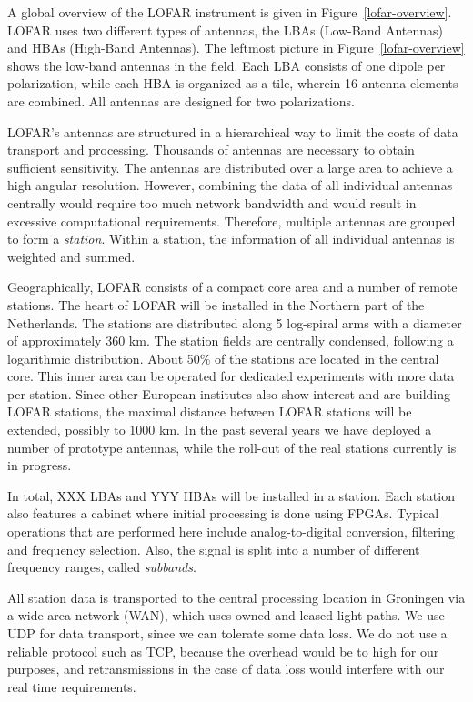 \documentclass[10pt]{article}
\begin{document}
A global overview of the LOFAR instrument is given in
Figure~\ref{lofar-overview}. LOFAR uses two different types of
antennas, the LBAs (Low-Band Antennas) and HBAs (High-Band Antennas).
The leftmost picture in Figure~\ref{lofar-overview} shows the low-band
antennas in the field.  Each LBA consists of one dipole per polarization,
while each HBA is organized as a tile, wherein 16 antenna elements are
combined. All antennas are designed for two polarizations.  

LOFAR's antennas are structured in a hierarchical way to limit the
costs of data transport and processing. Thousands of antennas are
necessary to obtain sufficient sensitivity. The antennas are
distributed over a large area to achieve a high angular resolution.
However, combining the data of all individual antennas centrally would
require too much network bandwidth and would result in excessive
computational requirements. Therefore, multiple antennas are grouped
to form a \emph{station}. Within a station, the information of all
individual antennas is weighted and summed.

Geographically, LOFAR consists of a compact core area and a number of
remote stations.  The heart of LOFAR will be installed in the Northern
part of the Netherlands.  The stations are distributed along 5
log-spiral arms with a diameter of approximately 360 km. The station
fields are centrally condensed, following a logarithmic distribution.
About 50\% of the stations are located in the central core. This inner
area can be operated for dedicated experiments with more data per
station.  Since other European institutes also show interest and are
building LOFAR stations, the maximal distance between LOFAR stations will be
extended, possibly to 1000 km.  In the past several years we have
deployed a number of prototype antennas, while the roll-out of
the real stations currently is in progress.

In total, XXX LBAs and YYY HBAs will be installed in a station. Each
station also features a cabinet where initial processing is done using
FPGAs.  Typical operations that are performed here include
analog-to-digital conversion, filtering and frequency selection. Also,
the signal is split into a number of different frequency ranges,
called \emph{subbands}.

All station data is transported to the central processing location in
Groningen via a wide area network (WAN), which uses owned and leased
light paths. We use UDP for data transport, since we can tolerate some
data loss. We do not use a reliable protocol such as TCP, because the
overhead would be to high for our purposes, and retransmissions in the
case of data loss would interfere with our real time requirements.
\end{document}
